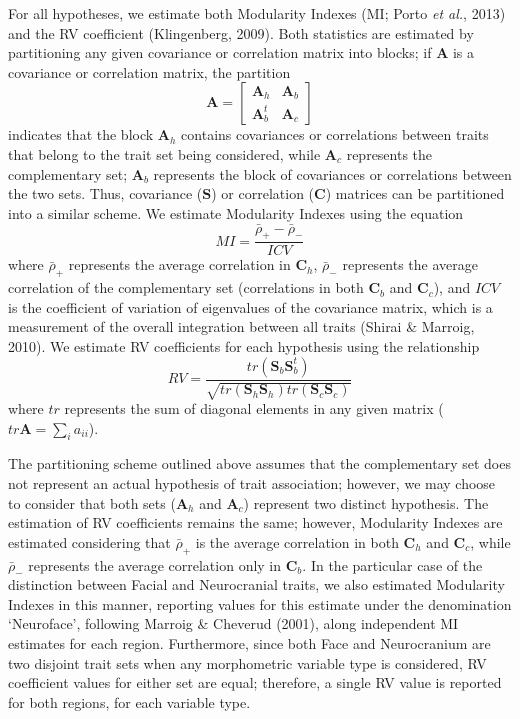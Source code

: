 \documentclass[12pt,]{article}
\begin{document}
For all hypotheses, we estimate both Modularity Indexes (MI; Porto
\emph{et al.}, 2013) and the RV coefficient (Klingenberg, 2009). Both
statistics are estimated by partitioning any given covariance or
correlation matrix into blocks; if $\mathbf{A}$ is a covariance or
correlation matrix, the partition \[
\mathbf{A} =
\begin{bmatrix}
\mathbf{A}_h & \mathbf{A}_b \\
\mathbf{A}^t_b & \mathbf{A}_c
\end{bmatrix}
\] indicates that the block $\mathbf{A}_h$ contains covariances or
correlations between traits that belong to the trait set being
considered, while $\mathbf{A}_c$ represents the complementary set;
$\mathbf{A}_b$ represents the block of covariances or correlations
between the two sets. Thus, covariance ($\mathbf{S}$) or correlation
($\mathbf{C}$) matrices can be partitioned into a similar scheme. We
estimate Modularity Indexes using the equation \[
MI = \frac {\bar{\rho}_{+} - \bar{\rho}_{-}} {ICV}
\] where $\bar{\rho}_{+}$ represents the average correlation in
$\mathbf{C}_h$, $\bar{\rho}_{-}$ represents the average correlation of
the complementary set (correlations in both $\mathbf{C}_b$ and
$\mathbf{C}_c$), and $ICV$ is the coefficient of variation of
eigenvalues of the covariance matrix, which is a measurement of the
overall integration between all traits (Shirai \& Marroig, 2010). We
estimate RV coefficients for each hypothesis using the relationship \[
RV = \frac{tr(\mathbf{S}_{b}\mathbf{S}^t_{b})}{\sqrt{tr(\mathbf{S}_h \mathbf{S}_h)tr(\mathbf{S}_c \mathbf{S}_c)}}
\] where $tr$ represents the sum of diagonal elements in any given
matrix ($tr \mathbf{A} = \sum_i a_{ii}$).

The partitioning scheme outlined above assumes that the complementary
set does not represent an actual hypothesis of trait association;
however, we may choose to consider that both sets ($\mathbf{A}_h$ and
$\mathbf{A}_c$) represent two distinct hypothesis. The estimation of RV
coefficients remains the same; however, Modularity Indexes are estimated
considering that $\bar{\rho}_{+}$ is the average correlation in both
$\mathbf{C}_h$ and $\mathbf{C}_c$, while $\bar{\rho}_{-}$ represents the
average correlation only in $\mathbf{C}_b$. In the particular case of
the distinction between Facial and Neurocranial traits, we also
estimated Modularity Indexes in this manner, reporting values for this
estimate under the denomination `Neuroface', following Marroig \&
Cheverud (2001), along independent MI estimates for each region.
Furthermore, since both Face and Neurocranium are two disjoint trait
sets when any morphometric variable type is considered, RV coefficient
values for either set are equal; therefore, a single RV value is
reported for both regions, for each variable type.
\end{document}
